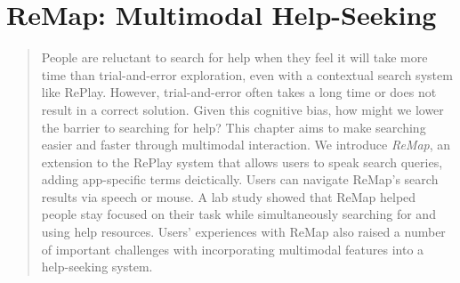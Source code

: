 


\chapter{ReMap: Multimodal Help-Seeking}
\label{chapter:remap}
\begin{quote}
People are reluctant to search for help when they feel it will take more time than trial-and-error exploration, even with a contextual search system like RePlay. However, trial-and-error often takes a long time or does not result in a correct solution. Given this cognitive bias, how might we lower the barrier to searching for help? This chapter aims to make searching easier and faster through multimodal interaction. We introduce \textit{ReMap}, an extension to the RePlay system that allows users to speak search queries, adding app-specific terms deictically. Users can navigate ReMap's search results via speech or mouse. A lab study showed that ReMap helped people stay focused on their task while simultaneously searching for and using help resources. Users' experiences with ReMap also raised a number of important challenges with incorporating multimodal features into a help-seeking system.
\end{quote}







